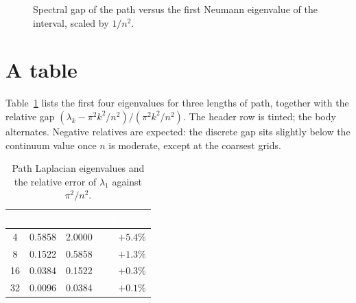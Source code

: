 \documentclass[10pt,twocolumn]{article}
\theoremstyle{definition}
\begin{document}
\begin{figure}[t]
\centering
{}
\caption{Spectral gap of the path versus the first Neumann eigenvalue of the interval, scaled by \(1/n^2\).}
\label{fig:gap}
\end{figure}

\section{A table}
\label{sec:table}
Table~\ref{tab:modes} lists the first four eigenvalues for three lengths of path, together with the relative gap \((\lambda_k-\pi^2 k^2/n^2)/(\pi^2 k^2/n^2)\). The header row is tinted; the body alternates. Negative relatives are expected: the discrete gap sits slightly below the continuum value once \(n\) is moderate, except at the coarsest grids.

\begin{table}[t]
\centering
\small
\begin{tabular}{@{}crrr@{}}
\toprule
\rowcolor{sfblue}
\textcolor{white}{\(n\)} & \textcolor{white}{\(\lambda_1\)} & \textcolor{white}{\(\lambda_2\)} & \textcolor{white}{rel.\ \(k{=}1\)} \\
\midrule
\rowcolor{sfpanel} 4  & 0.5858 & 2.0000 & \(+5.4\%\) \\
8  & 0.1522 & 0.5858 & \(+1.3\%\) \\
\rowcolor{sfpanel} 16 & 0.0384 & 0.1522 & \(+0.3\%\) \\
32 & 0.0096 & 0.0384 & \(+0.1\%\) \\
\bottomrule
\end{tabular}
\caption{Path Laplacian eigenvalues and the relative error of \(\lambda_1\) against \(\pi^2/n^2\).}
\label{tab:modes}
\end{table}
\end{document}
